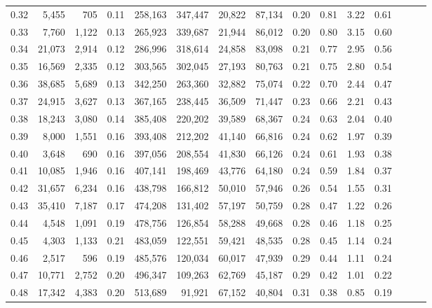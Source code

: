 \begin{tabular}{rrrrrrrrrrrrrrr}
0.32 &   5,455 &    705 &  0.11 &  258,163 &  347,447 &   20,822 &   87,134 &  0.20 &  0.81 &  3.22 &      0.61 \\
0.33 &   7,760 &  1,122 &  0.13 &  265,923 &  339,687 &   21,944 &   86,012 &  0.20 &  0.80 &  3.15 &      0.60 \\
0.34 &  21,073 &  2,914 &  0.12 &  286,996 &  318,614 &   24,858 &   83,098 &  0.21 &  0.77 &  2.95 &      0.56 \\
0.35 &  16,569 &  2,335 &  0.12 &  303,565 &  302,045 &   27,193 &   80,763 &  0.21 &  0.75 &  2.80 &      0.54 \\
0.36 &  38,685 &  5,689 &  0.13 &  342,250 &  263,360 &   32,882 &   75,074 &  0.22 &  0.70 &  2.44 &      0.47 \\
0.37 &  24,915 &  3,627 &  0.13 &  367,165 &  238,445 &   36,509 &   71,447 &  0.23 &  0.66 &  2.21 &      0.43 \\
0.38 &  18,243 &  3,080 &  0.14 &  385,408 &  220,202 &   39,589 &   68,367 &  0.24 &  0.63 &  2.04 &      0.40 \\
0.39 &   8,000 &  1,551 &  0.16 &  393,408 &  212,202 &   41,140 &   66,816 &  0.24 &  0.62 &  1.97 &      0.39 \\
0.40 &   3,648 &    690 &  0.16 &  397,056 &  208,554 &   41,830 &   66,126 &  0.24 &  0.61 &  1.93 &      0.38 \\
0.41 &  10,085 &  1,946 &  0.16 &  407,141 &  198,469 &   43,776 &   64,180 &  0.24 &  0.59 &  1.84 &      0.37 \\
0.42 &  31,657 &  6,234 &  0.16 &  438,798 &  166,812 &   50,010 &   57,946 &  0.26 &  0.54 &  1.55 &      0.31 \\
0.43 &  35,410 &  7,187 &  0.17 &  474,208 &  131,402 &   57,197 &   50,759 &  0.28 &  0.47 &  1.22 &      0.26 \\
0.44 &   4,548 &  1,091 &  0.19 &  478,756 &  126,854 &   58,288 &   49,668 &  0.28 &  0.46 &  1.18 &      0.25 \\
0.45 &   4,303 &  1,133 &  0.21 &  483,059 &  122,551 &   59,421 &   48,535 &  0.28 &  0.45 &  1.14 &      0.24 \\
0.46 &   2,517 &    596 &  0.19 &  485,576 &  120,034 &   60,017 &   47,939 &  0.29 &  0.44 &  1.11 &      0.24 \\
0.47 &  10,771 &  2,752 &  0.20 &  496,347 &  109,263 &   62,769 &   45,187 &  0.29 &  0.42 &  1.01 &      0.22 \\
0.48 &  17,342 &  4,383 &  0.20 &  513,689 &   91,921 &   67,152 &   40,804 &  0.31 &  0.38 &  0.85 &      0.19 \\

\end{tabular}
